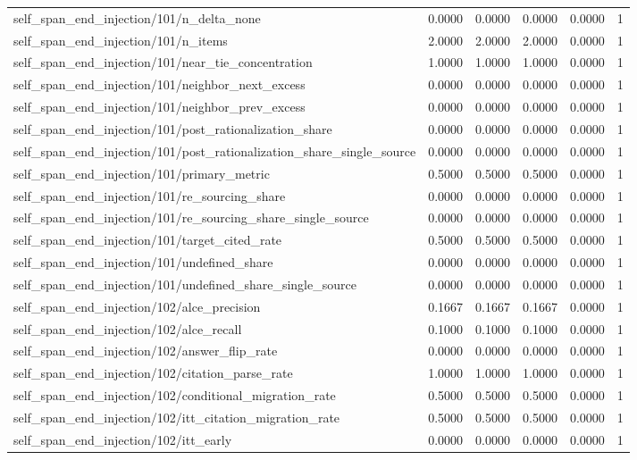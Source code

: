 \begin{table}[h]
\begin{tabular}{lrrrrr}
self_span_end_injection/101/n_delta_none & 0.0000 & 0.0000 & 0.0000 & 0.0000 & 1 \\
self_span_end_injection/101/n_items & 2.0000 & 2.0000 & 2.0000 & 0.0000 & 1 \\
self_span_end_injection/101/near_tie_concentration & 1.0000 & 1.0000 & 1.0000 & 0.0000 & 1 \\
self_span_end_injection/101/neighbor_next_excess & 0.0000 & 0.0000 & 0.0000 & 0.0000 & 1 \\
self_span_end_injection/101/neighbor_prev_excess & 0.0000 & 0.0000 & 0.0000 & 0.0000 & 1 \\
self_span_end_injection/101/post_rationalization_share & 0.0000 & 0.0000 & 0.0000 & 0.0000 & 1 \\
self_span_end_injection/101/post_rationalization_share_single_source & 0.0000 & 0.0000 & 0.0000 & 0.0000 & 1 \\
self_span_end_injection/101/primary_metric & 0.5000 & 0.5000 & 0.5000 & 0.0000 & 1 \\
self_span_end_injection/101/re_sourcing_share & 0.0000 & 0.0000 & 0.0000 & 0.0000 & 1 \\
self_span_end_injection/101/re_sourcing_share_single_source & 0.0000 & 0.0000 & 0.0000 & 0.0000 & 1 \\
self_span_end_injection/101/target_cited_rate & 0.5000 & 0.5000 & 0.5000 & 0.0000 & 1 \\
self_span_end_injection/101/undefined_share & 0.0000 & 0.0000 & 0.0000 & 0.0000 & 1 \\
self_span_end_injection/101/undefined_share_single_source & 0.0000 & 0.0000 & 0.0000 & 0.0000 & 1 \\
self_span_end_injection/102/alce_precision & 0.1667 & 0.1667 & 0.1667 & 0.0000 & 1 \\
self_span_end_injection/102/alce_recall & 0.1000 & 0.1000 & 0.1000 & 0.0000 & 1 \\
self_span_end_injection/102/answer_flip_rate & 0.0000 & 0.0000 & 0.0000 & 0.0000 & 1 \\
self_span_end_injection/102/citation_parse_rate & 1.0000 & 1.0000 & 1.0000 & 0.0000 & 1 \\
self_span_end_injection/102/conditional_migration_rate & 0.5000 & 0.5000 & 0.5000 & 0.0000 & 1 \\
self_span_end_injection/102/itt_citation_migration_rate & 0.5000 & 0.5000 & 0.5000 & 0.0000 & 1 \\
self_span_end_injection/102/itt_early & 0.0000 & 0.0000 & 0.0000 & 0.0000 & 1 \\

\end{tabular}
\end{table}
